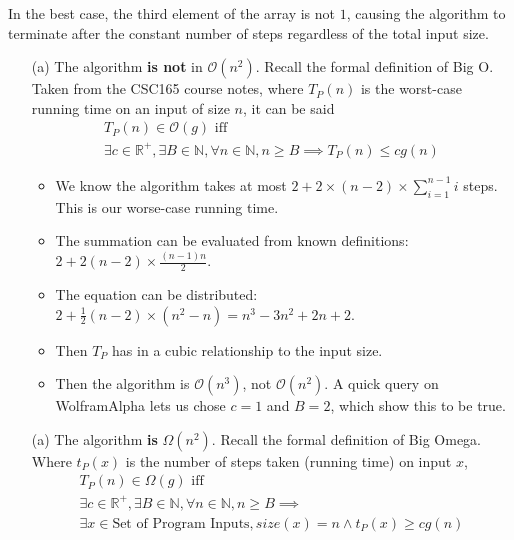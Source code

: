 \documentclass{article}
\begin{document}
\begin{enumerate}
    In the best case, the third element of the array is not $1$, causing the algorithm to terminate after the constant number of steps regardless of the total input size.
    \begin{enumerate}
    \item [(a)] The algorithm \textbf{is not} in $\mathcal{O}(n^2)$. Recall the formal definition of Big O. Taken from the CSC165 course notes, where $T_P(n)$ is the worst-case running time on an input of size $n$, it can be said
        \begin{gather*}
            T_P(n) \in \mathcal{O}(g) \text{ iff} \\
            \exists c \in \mathbb{R^+}, \exists B \in \mathbb{N}, \forall n \in \mathbb{N}, n \geq B \implies T_P(n) \leq cg(n)
        \end{gather*}
        \begin{itemize}
        \item We know the algorithm takes at most $2 + 2 \times (n - 2) \times \sum_{i = 1}^{n - 1} i$ steps. This is our worse-case running time.
        \item The summation can be evaluated from known definitions: $2 + 2 (n - 2) \times \frac{(n - 1) n}{2}$.
        \item The equation can be distributed: $2 + \frac{1}{2} (n - 2) \times (n^2 - n) = n^3 - 3n^2 + 2n + 2$.
        \item Then $T_P$ has in a cubic relationship to the input size.
        \item Then the algorithm is $\mathcal O(n^3)$, not $\mathcal O(n^2)$. A quick query on WolframAlpha lets us chose $c = 1$ and $B = 2$, which show this to be true.
        \end{itemize}
    \end{enumerate}
    \begin{enumerate}
    \item [(a)] The algorithm \textbf{is} $\Omega(n^2)$. Recall the formal definition of Big Omega. Where $t_P(x)$ is the number of steps taken (running time) on input $x$,
        \begin{gather*}
            T_P(n) \in \Omega(g) \text{ iff} \\
            \exists c \in \mathbb{R^+}, \exists B \in \mathbb{N}, \forall n \in \mathbb{N}, n \geq B \implies \\
            \exists x \in \text{Set of Program Inputs}, size(x) = n \land t_P(x) \geq cg(n)
        \end{gather*}
        \begin{itemize}

\end{itemize}
\end{enumerate}
\end{enumerate}
\end{document}
